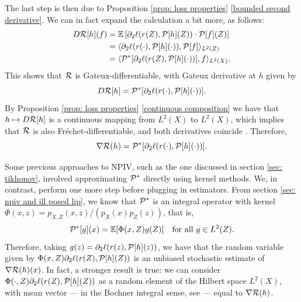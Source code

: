 The last step is then due to Proposition \ref{prop: loss properties} \ref{bounded second derivative}.
We can in fact expand the calculation a bit more, as follows:
\begin{align*}
    D \mathcal{R} [ h ] ( f )
    &= \mathbb{E} \left[
        \partial_{ 2 } \ell ( r ( Z ), \mathcal{P} [ h ] ( Z ) ) \cdot \mathcal{P} [ f ] ( Z )
    \right] \\
    &= \langle  \partial_{ 2 } \ell ( r ( \cdot ), \mathcal{P} [ h ] ( \cdot ) ), \mathcal{P} [ f ]  \rangle_{ L^{ 2 } ( Z ) } \\
    &= \langle  \mathcal{P}^{ * } [ \partial_{ 2 } \ell ( r ( Z ), \mathcal{P} [ h ] ( \cdot ) ) ], f  \rangle_{ L^{ 2 } ( X ) }
.\end{align*}
This shows that $ \mathcal{R} $ is Gateux-differentiable, with Gateux derivative at $ h $ given by
\begin{equation*}
    D \mathcal{R} [ h ] = \mathcal{P}^{ * } [ \partial_{ 2 } \ell ( r ( \cdot ), \mathcal{P} [ h ] ( \cdot ) ) ]
.\end{equation*}
By Proposition \ref{prop: loss properties} \ref{continuous composition} we have that $ h \mapsto D \mathcal{R} [ h ] $ is a continuous mapping from $ L^{ 2 } ( X ) $ to $ L^{ 2 } ( X ) $, which implies that $ \mathcal{R} $ is also Fréchet-differentiable, and both derivatives coincide \cite[Theorem~3.3]{pathak2018}.
Therefore,
\begin{equation}
    \label{eq: risk gradient}
   \nabla \mathcal{R} ( h ) = \mathcal{P}^{ * } [ \partial_{ 2 } \ell ( r ( \cdot ), \mathcal{P} [ h ] ( \cdot ) ) ]  
.\end{equation}

Some previous approaches to NPIV, such as the one discussed in section \ref{sec: tikhonov}, involved approximating $ \mathcal{P}^{ * } $ directly using kernel methods.
We, in contrast, perform one more step before plugging in estimators.
From section \ref{sec: npiv and ill posed lip}, we know that $ \mathcal{P}^{ * } $ is an integral operator with kernel $ \Phi ( x, z ) = p_{ X, Z } ( x, z ) / ( p_{ X } ( x ) p_{ Z } ( z ) ) $, that is,
\begin{equation*}
    \mathcal{P}^{ * } [ g ] ( x ) = \mathbb{E} [ \Phi ( x, Z ) g ( Z ) ] \quad \text{for all } g \in L^2 ( Z )
.\end{equation*}
Therefore, taking $ g ( z ) = \partial_{ 2 } \ell ( r ( z ), \mathcal{P} [ h ] ( z ) ) $, we have that the random variable given by $ \Phi ( x, Z ) \partial_{ 2 } \ell ( r ( Z ), \mathcal{P} [ h ] ( Z ) ) $ is an unbiased stochastic estimate of $ \nabla \mathcal{R} ( h ) ( x ) $.
In fact, a stronger result is true: we can consider $ \Phi ( \cdot, Z ) \partial_{ 2 } \ell ( r ( Z ), \mathcal{P} [ h ] ( Z ) ) $ as a random element of the Hilbert space $ L^2 ( X ) $, with mean vector --- in the Bochner integral sense, see \cite[Chapter~7]{hsing2015} --- equal to $ \nabla \mathcal{R} ( h ) $.

